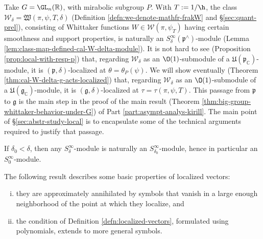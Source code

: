 \begin{example}\label{exa:cal-W-delta-mirabolic}
  Take $G = \GL_n(\mathbb{R})$, with mirabolic subgroup $P$.  With $T := 1/\h$, the class $\mathcal{W}_\delta = \mathfrak{W}(\pi,\psi,T,\delta)$ (Definition \ref{defn:we-denote-mathfr-frakW} and \S\ref{sec:quant-prel}), consisting of Whittaker functions $W \in \mathcal{W}(\pi,\psi_T)$ having certain smoothness and support properties, is naturally an $S_\delta^\infty(\mathfrak{p}^\wedge)$-module (Lemma \ref{lem:class-map-defined-cal-W-delta-module}).  It is not hard to see (Proposition \ref{prop:local-with-resp-p}) that, regarding $\mathcal{W}_\delta$ as an $\O(1)$-submodule of a $\mathfrak{U}(\mathfrak{p}_\mathbb{C})$-module, it is $(\mathfrak{p},\delta)$-localized at $\theta = \theta_P(\psi)$.  We will show eventually (Theorem \ref{thm:cal-W-delta-g-acts-localized}) that, regarding $\mathcal{W}_\delta$ as an $\O(1)$-submodule of a $\mathfrak{U}(\mathfrak{g}_\mathbb{C})$-module, it is $(\mathfrak{g},\delta)$-localized at $\tau = \tau(\pi,\psi,T)$.  This passage from $\mathfrak{p}$ to $\mathfrak{g}$ is the main step in the proof of the main result (Theorem \ref{thm:big-group-whittaker-behavior-under-G}) of Part \ref{part:asympt-analys-kirill}.  The main point of \S\ref{sec:abstr-study-local} is to encapsulate some of the technical arguments required to justify that passage.
\end{example}

\begin{example}\label{example:delta-to-zero-module}
  If $\delta_0 < \delta$, then any $S^\infty_\delta$-module is naturally an $S^\infty_{\delta_0}$-module, hence in particular an $S^\infty_0$-module.
\end{example}


The following result describes some basic properties of localized vectors:
\begin{enumerate}[(i)]
\item they are approximately annihilated by symbols that vanish in a large enough neighborhood of the point at which they localize, and
\item the condition of Definition \ref{defn:localized-vectors}, formulated using polynomials, extends to more general symbols.
\end{enumerate}

